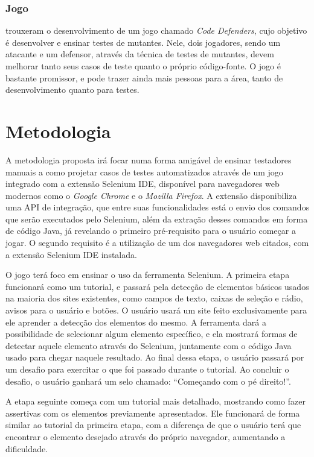 \documentclass[twoside,english,brazilian]{UNISINOSartigo}
\begin{document}
\subsubsection{Jogo}

\cite{Rojas} trouxeram o desenvolvimento de um jogo chamado \textit{Code Defenders}, cujo objetivo é desenvolver e ensinar testes de mutantes. Nele, dois jogadores, sendo um atacante e um defensor, através da técnica de testes de mutantes, devem melhorar tanto seus casos de teste quanto o próprio código-fonte. O jogo é bastante promissor, e pode trazer ainda mais pessoas para a área, tanto de desenvolvimento quanto para testes. 


\section{Metodologia}

A metodologia proposta irá focar numa forma amigável de ensinar testadores manuais a como projetar casos de testes automatizados através de um jogo integrado com a extensão Selenium IDE, disponível para navegadores web modernos como o \textit{Google Chrome} e o \textit{Mozilla Firefox}. A extensão disponibiliza uma API de integração, que entre suas funcionalidades está o envio dos comandos que serão executados pelo Selenium, além da extração desses comandos em forma de código Java, já revelando o primeiro pré-requisito para o usuário começar a jogar. O segundo requisito é a utilização de um dos navegadores web citados, com a extensão Selenium IDE instalada. 

O jogo terá foco em ensinar o uso da ferramenta Selenium. A primeira etapa funcionará como um tutorial, e passará pela detecção de elementos básicos usados na maioria dos sites existentes, como campos de texto, caixas de seleção e rádio, avisos para o usuário e botões. O usuário usará um site feito exclusivamente para ele aprender a detecção dos elementos do mesmo. A ferramenta dará a possibilidade de selecionar algum elemento específico, e ela mostrará formas de detectar aquele elemento através do Selenium, juntamente com o código Java usado para chegar naquele resultado. Ao final dessa etapa, o usuário passará por um desafio para exercitar o que foi passado durante o tutorial. Ao concluir o desafio, o usuário ganhará um selo chamado: ``Começando com o pé direito!''. 

A etapa seguinte começa com um tutorial mais detalhado, mostrando como fazer assertivas com os elementos previamente apresentados. Ele funcionará de forma similar ao tutorial da primeira etapa, com a diferença de que o usuário terá que encontrar o elemento desejado através do próprio navegador, aumentando a dificuldade.
\end{document}
